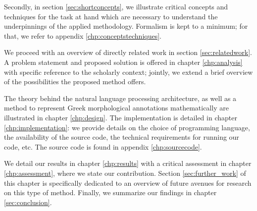 Secondly, in section \vref{sec:shortconcepts}, we illustrate critical
concepts and techniques for the task at hand which are necessary to
understand the underpinnings of the applied methodology. Formalism is
kept to a minimum; for that, we refer to appendix
\vref{chp:conceptstechniques}.

We proceed with an overview of directly related work in
section \vref{sec:relatedwork}. A problem statement and proposed solution is
offered in chapter \vref{chp:analysis} with specific reference to the
scholarly context; jointly, we extend a brief overview of the
possibilities the proposed method offers.

The theory behind the natural language processing architecture, as
well as a method to represent Greek morphological annotations
mathematically are illustrated in chapter \vref{chp:design}. The
implementation is detailed in chapter \vref{chp:implementation}: we provide
details on the choice of programming language, the availability of the
source code, the technical requirements for running our code, etc. The
source code is found in appendix \vref{chp:sourcecode}.

We detail our results in chapter \vref{chp:results} with a critical
assessment in chapter \vref{chp:assessment}, where we state our
contribution. Section \vref{sec:further_work} of this chapter is
specifically dedicated to an overview of future avenues for research
on this type of method. Finally, we summarize our findings in chapter
\vref{sec:conclusion}.


